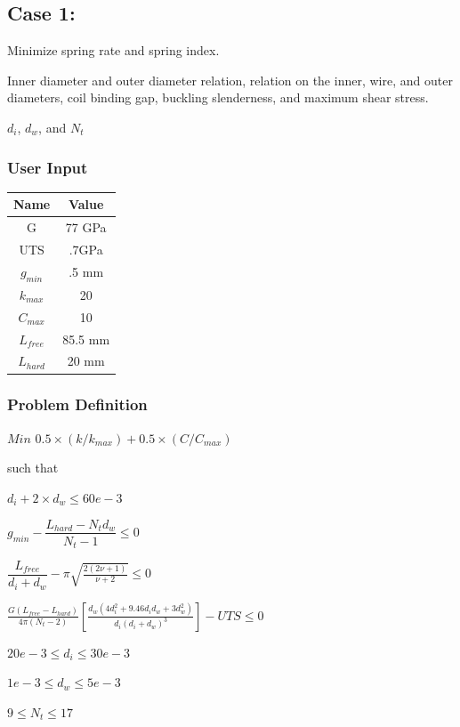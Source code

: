 \documentclass[10pt]{article}
\begin{document}
\subsection{Case 1:}
\label{subsec:Case1}

\begin{description}[leftmargin=!,labelwidth=\widthof{\bfseries State Variables:}, labelindent = 1cm]
 	\item [Objectives:] Minimize spring rate and spring index.\\

	\item[Constraints:] Inner diameter and outer diameter relation, relation on the inner, wire, and outer diameters, coil binding gap, buckling slenderness, and maximum shear stress. \\
	\item[State Variables:] $d_{i}$, $d_{w}$, and $N_{t}$ \\
\end{description}

	\subsubsection{User Input}
	
\begin{center}
	 \begin{tabular}{| c  | c |  }
	 	\hline Name & Value\\
	 	\hline G & 77 GPa \\
		\hline UTS & .7GPa \\
		\hline $g_{min}$ & .5 mm\\ 
	 	\hline $k_{max}$ & 20\\
		\hline $C_{max}$ & 10\\
		\hline $L_{free}$ & 85.5 mm\\
		\hline $L_{hard}$ & 20 mm\\
		\hline
	 \end{tabular}
\end{center}

	

	\subsubsection{Problem Definition}
	
	\centerline{$Min$ \hspace{2 mm}$0.5 \times(k/k_{max}) + 0.5 \times (C/C_{max})$}
	\begin{center}such that \end{center}
	\centerline{$d_{i} + 2 \times d_{w} \leq 60e-3$}
	\centerline{$g_{min} - \dfrac{L_{hard} - N_{t}d_{w}}{N_{t}-1} \leq 0$}
	\centerline{$\dfrac{L_{free}}{d_{i} + d_{w}} - \pi \sqrt{\frac{2(2 \nu + 1)}{\nu + 2}} \leq 0$}
	\centerline{$\frac{G(L_{free} - L_{hard})}{4 \pi (N_{t} - 2) } \left[\frac{d_{w} (4d_{i}^{2} + 9.46d_{i} 
d_{w} + 3 d_{w}^{2})}{d_{i}(d_{i}+d_{w})^{3}}\right] - UTS \leq 0$}
    \centerline{$20e-3 \leq d_{i} \leq 30e-3$}
    \centerline{$1e-3 \leq d_{w} \leq 5e-3$}
    \centerline{$9 \leq N_{t} \leq 17$}
    
\end{document}
